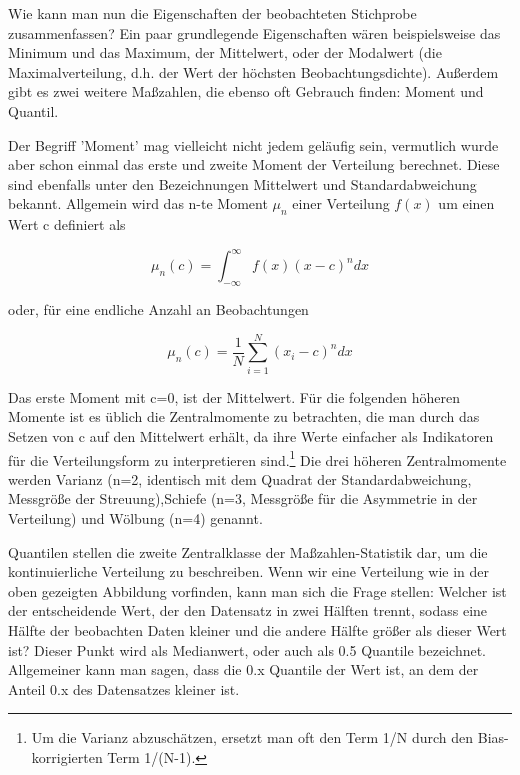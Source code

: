 \documentclass[a4paper,twoside]{tufte-book}\usepackage[]{graphicx}\usepackage[]{color}
\begin{document}
Wie kann man nun die Eigenschaften der beobachteten Stichprobe zusammenfassen? Ein paar grundlegende Eigenschaften wären beispielsweise das Minimum und das Maximum, der Mittelwert, oder der Modalwert (die Maximalverteilung, d.h. der Wert der höchsten Beobachtungsdichte). Außerdem  gibt es zwei weitere Maßzahlen, die ebenso oft Gebrauch finden: Moment und Quantil.


Der Begriff 'Moment' mag vielleicht nicht jedem geläufig sein, vermutlich wurde aber schon einmal das erste und zweite Moment der Verteilung berechnet. Diese sind ebenfalls unter den Bezeichnungen Mittelwert und Standardabweichung bekannt. Allgemein wird das n-te Moment $\mu_n$ einer Verteilung $f(x)$ um einen Wert c definiert als 

\begin{equation}
\mu_n(c) = \int_{-\infty}^{\infty} f(x) (x - c)^n dx
\end{equation}

oder, für eine endliche Anzahl an Beobachtungen 

\begin{equation}
\mu_n(c) = \frac{1}{N}\sum_{i=1}^N (x_i - c)^n dx
\end{equation}

Das erste Moment mit c=0, ist der Mittelwert. Für die folgenden höheren Momente ist es üblich die Zentralmomente zu betrachten, die man durch das Setzen von c auf den Mittelwert erhält, da ihre Werte einfacher als Indikatoren für die Verteilungsform zu interpretieren sind.\footnote{Um die Varianz abzuschätzen, ersetzt man oft den Term 1/N durch den Bias-korrigierten Term 1/(N-1).} Die drei höheren Zentralmomente werden Varianz (n=2, identisch mit dem Quadrat der Standardabweichung, Messgröße der Streuung),Schiefe (n=3, Messgröße für die Asymmetrie in der Verteilung) und Wölbung (n=4) genannt. 

Quantilen stellen die zweite Zentralklasse der Maßzahlen-Statistik dar, um die kontinuierliche Verteilung zu beschreiben. Wenn wir eine Verteilung wie in der oben gezeigten Abbildung vorfinden, kann man sich die Frage stellen: Welcher ist der entscheidende Wert, der den Datensatz in zwei Hälften trennt, sodass eine Hälfte der beobachten Daten kleiner und die andere Hälfte größer als dieser Wert ist? Dieser Punkt wird als Medianwert, oder auch als 0.5 Quantile bezeichnet. Allgemeiner kann man sagen, dass die 0.x Quantile der Wert ist, an dem der Anteil 0.x des Datensatzes kleiner ist. 
\end{document}

